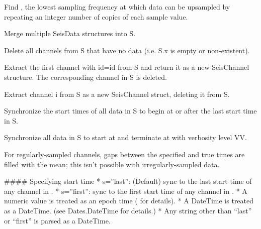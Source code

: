 \documentclass[letterpaper,11pt,english]{sphinxmanual}
\begin{document}
Find , the lowest sampling frequency at which data can be upsampled by repeating an integer number of copies of each sample value.


\begin{fulllineitems}
\end{fulllineitems}


Merge multiple SeisData structures into S.


\begin{fulllineitems}
\end{fulllineitems}


Delete all channels from S that have no data (i.e. S.x is empty or non-existent).

\begin{fulllineitems}
\label{\detokenize{src/Processing/processing:pull}}
\end{fulllineitems}


Extract the first channel with id=id from S and return it as a new SeisChannel structure. The corresponding channel in S is deleted.


\begin{fulllineitems}
\end{fulllineitems}


Extract channel i from S as a new SeisChannel struct, deleting it from S.

Synchronize the start times of all data in S to begin at or after the last
start time in S.

Synchronize all data in S to start at  and terminate at  with verbosity level VV.

For regularly-sampled channels, gaps between the specified and true times
are filled with the mean; this isn’t possible with irregularly-sampled data.

\#\#\#\# Specifying start time
* s=”last”: (Default) sync to the last start time of any channel in .
* s=”first”: sync to the first start time of any channel in .
* A numeric value is treated as an epoch time ( for details).
* A DateTime is treated as a DateTime. (see Dates.DateTime for details.)
* Any string other than “last” or “first” is parsed as a DateTime.
\end{document}
